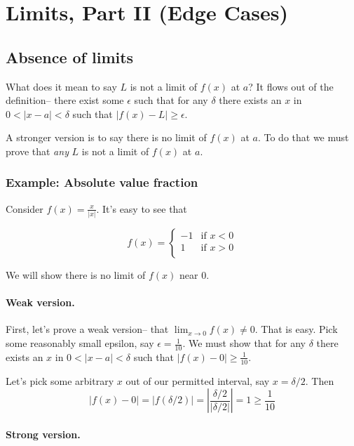 \section{Limits, Part II (Edge Cases)}

\subsection{Absence of limits}

What does it mean to say $L$ is not a limit of $f(x)$ at $a$? It flows
out of the definition-- there exist some $\epsilon$ such that for any
$\delta$ there exists an $x$ in $0<|x-a|<\delta$ such that $|f(x)-L|\geq\epsilon$.

\vs

A stronger version is to say there is no limit of $f(x)$ at $a$. To do
that we must prove that \textit{any} $L$ is not a limit of $f(x)$ at
$a$.

\subsubsection*{Example: Absolute value fraction}

Consider $f(x)=\frac{x}{|x|}$. It's easy to see that

\[f(x)=\begin{cases}
    -1 & \text{if } x<0\\
    1 & \text{if } x>0\\
\end{cases}\]

We will show there is no limit of $f(x)$ near $0$.

\paragraph{Weak version.}

First, let's prove a weak version-- that $\lim_{x\to 0}f(x)\neq 0$. That is
easy. Pick some reasonably small epsilon, say $\epsilon=\frac{1}{10}$. We
must show that for any $\delta$ there exists an $x$ in
$0<|x-a|<\delta$ such that $|f(x)-0|\geq \frac{1}{10}$.

\vs

Let's pick some arbitrary $x$ out of our permitted interval, say $x=\delta/2$. Then
\[|f(x)-0|=|f(\delta/2)|=\left|\frac{\delta/2}{|\delta/2|}\right|=1\geq\frac{1}{10}\]


\paragraph{Strong version.}

